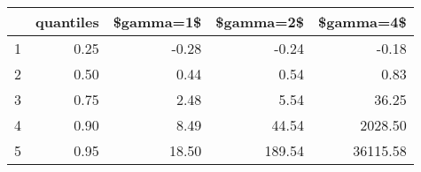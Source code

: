 \begin{table}[ht]
\centering
\begin{tabular}{rrrrr}
  \hline
 & quantiles & \$gamma=1\$ & \$gamma=2\$ & \$gamma=4\$ \\ 
  \hline
1 & 0.25 & -0.28 & -0.24 & -0.18 \\ 
  2 & 0.50 & 0.44 & 0.54 & 0.83 \\ 
  3 & 0.75 & 2.48 & 5.54 & 36.25 \\ 
  4 & 0.90 & 8.49 & 44.54 & 2028.50 \\ 
  5 & 0.95 & 18.50 & 189.54 & 36115.58 \\ 
   \hline
\end{tabular}
\end{table}
